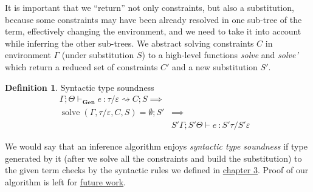 \documentclass[declaration,shortabstract]{iithesis}
\theoremstyle{definition} \newtheorem{definition}{Definition}[section]
\newcommand{\types}[4][\Gamma;\Theta]{\ensuremath{{{#1} \vdash {#2} \: : {#3}/{#4}}}}
\newcommand{\gens}[6][\Gamma;\Theta]{\ensuremath{{{#1} \vdash_\textbf{Gen} {#2} \: : {#3}/{#4}} \rightsquigarrow {#5};{#6}}}
\begin{document}
It is important that we ``return'' not only constraints, but also a substitution, 
because some constraints may have been already resolved in
one sub-tree of the term, effectively changing the environment,
and we need to take it into account while inferring the other sub-trees.
We abstract solving constraints $C$ in environment $\Gamma$ (under substitution $S$) to
a high-level functions \textit{solve} and \textit{solve'} which return a reduced set of constraints $C'$ and
a new substitution $S'$. 
\theoremstyle{definition} 
\begin{definition}{Syntactic type soundness}
   $$
   \begin{aligned}
    \gens{e}{\tau}{\varepsilon}{C}{S} \implies& &\\
    \operatorname{solve}(\Gamma,\tau/\varepsilon, C, S) = \emptyset; S' & \implies & \\
      &\types[S'\Gamma;S'\Theta]{e}{S'\tau}{S'\varepsilon} &
    \end{aligned}
    $$
\end{definition}
We would say that an inference algorithm enjoys \textit{syntactic type soundness}
if type generated by it (after we solve all the constraints and build the substitution)
to the given term checks by the syntactic rules we defined in \hyperlink{chapter.3}{chapter 3}.
Proof of our algorithm is left for \hyperlink{chapter.6}{future work}.
\end{document}
